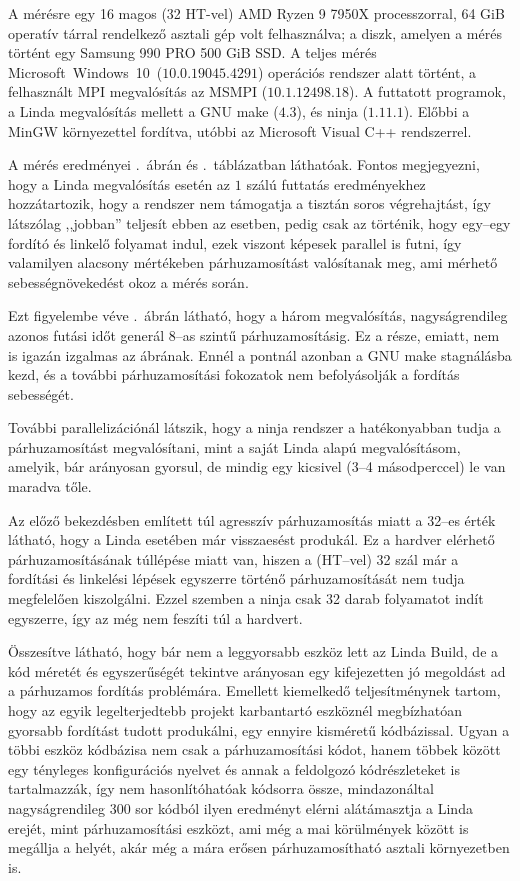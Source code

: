 A mérésre egy 16 magos (32 HT-vel) AMD Ryzen 9 7950X processzorral, 64 GiB operatív tárral rendelkező asztali gép volt felhasználva; a diszk, amelyen a mérés történt egy Samsung 990 PRO 500 GiB SSD.
A teljes mérés \hbox{Microsoft Windows 10 ($10.0.19045.4291$)} operációs rendszer alatt történt, a felhasznált MPI megvalósítás az MSMPI ($10.1.12498.18$). A futtatott programok, a Linda megvalósítás mellett a GNU make ($4.3$), és ninja ($1.11.1$).
Előbbi a MinGW környezettel fordítva, utóbbi az Microsoft Visual C++ rendszerrel.

A mérés eredményei .~ábrán és .~táblázatban\label{hf:tbl-ref} láthatóak.
Fontos megjegyezni, hogy a Linda megvalósítás esetén az $1$ szálú futtatás eredményekhez hozzátartozik, hogy a rendszer nem támogatja a tisztán soros végrehajtást, így látszólag ,,jobban'' teljesít ebben az esetben, pedig csak az történik, hogy egy--egy fordító és linkelő folyamat indul, ezek viszont képesek parallel is futni, így valamilyen alacsony mértékeben párhuzamosítást valósítanak meg, ami mérhető sebességnövekedést okoz a mérés során.

Ezt figyelembe véve .~ábrán látható, hogy a három megvalósítás, nagyságrendileg azonos futási időt generál $8$--as szintű párhuzamosításig.
Ez a része, emiatt, nem is igazán izgalmas az ábrának.
Ennél a pontnál azonban a GNU make stagnálásba kezd, és a további párhuzamosítási fokozatok nem befolyásolják a fordítás sebességét.

További parallelizációnál látszik, hogy a ninja rendszer a hatékonyabban tudja a párhuzamosítást megvalósítani, mint a saját Linda alapú megvalósításom, amelyik, bár arányosan gyorsul, de mindig egy kicsivel (3--4 másodperccel) le van maradva tőle.

Az előző bekezdésben említett túl agresszív párhuzamosítás miatt a 32--es érték látható, hogy a Linda esetében már visszaesést produkál.
Ez a hardver elérhető párhuzamosításának túllépése miatt van, hiszen a (HT--vel) 32 szál már a fordítási és linkelési lépések egyszerre történő párhuzamosítását nem tudja megfelelően kiszolgálni.
Ezzel szemben a ninja csak 32 darab folyamatot indít egyszerre, így az még nem feszíti túl a hardvert.

Összesítve látható, hogy bár nem a leggyorsabb eszköz lett az Linda Build, de a kód méretét és egyszerűségét tekintve arányosan egy kifejezetten jó megoldást ad a párhuzamos fordítás problémára.
Emellett kiemelkedő teljesítménynek tartom, hogy az egyik legelterjedtebb projekt karbantartó eszköznél megbízhatóan gyorsabb fordítást tudott produkálni, egy ennyire kisméretű kódbázissal.
Ugyan a többi eszköz kódbázisa nem csak a párhuzamosítási kódot, hanem többek között egy tényleges konfigurációs nyelvet és annak a feldolgozó kódrészleteket is tartalmazzák, így nem hasonlítóhatóak kódsorra össze, mindazonáltal nagyságrendileg 300 sor kódból ilyen eredményt elérni alátámasztja a Linda erejét, mint párhuzamosítási eszközt, ami még a mai körülmények között is megállja a helyét, akár még a mára erősen párhuzamosítható asztali környezetben is.

